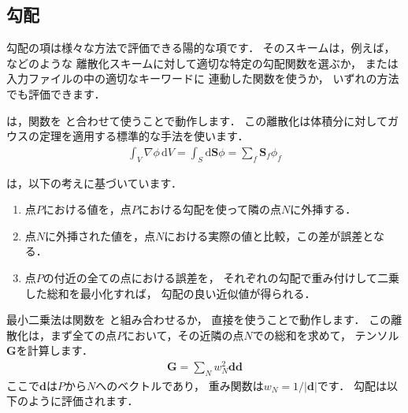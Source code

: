 \subsection{勾配}
\label{ssec:2.4.6}
%
勾配の項は様々な方法で評価できる陽的な項です．
そのスキームは，例えば，などのような
離散化スキームに対して適切な特定の勾配関数を選ぶか，
または入力ファイルの中の適切なキーワードに
連動した関数を使うか，
いずれの方法でも評価できます．
\begin{description}
%
 \item[ガウス積分] は，関数を
            と合わせて使うことで動作します．
            この離散化は体積分に対してガウスの定理を適用する標準的な手法を使います．
            \begin{align}
             \label{eq:2.25}
             \int_{V}\nabla\phi\,\mathrm{d}V
             = \int_{S}\mathrm{d}\bm{S}\phi
             = \sum_{f}\bm{S}_{f}\phi_{f}
            \end{align}
%
 \item[最小二乗法] は，以下の考えに基づいています．
            \begin{enumerate}
             \item 点$P$における値を，点$P$における勾配を使って隣の点$N$に外挿する．
             \item 点$N$に外挿された値を，点$N$における実際の値と比較，この差が誤差となる．
             \item 点$P$の付近の全ての点における誤差を，
                   それぞれの勾配で重み付けして二乗した総和を最小化すれば，
                   勾配の良い近似値が得られる．
            \end{enumerate}
            最小二乗法は関数を
            と組み合わせるか，
            直接を使うことで動作します．
            この離散化は，まず全ての点$P$において，その近隣の点$N$での総和を求めて，
            テンソル$\bm{G}$を計算します．
            \begin{align}
             \label{eq:2.26}
             \bm{G} = \sum_{N}w_{N}^{2}\bm{d}\bm{d}
            \end{align}
            ここで$\bm{d}$は$P$から$N$へのベクトルであり，
            重み関数は$w_{N} = 1/|\bm{d}|$です．
            勾配は以下のように評価されます．

\end{description}
